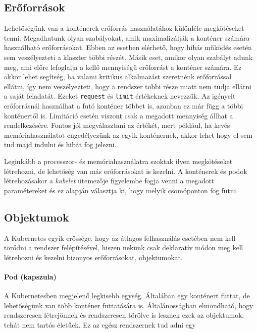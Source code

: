 \subsection{Erőforrások}
Lehetőségünk van a konténerek erőforrás használatához különféle megkötéseket tenni. Megadhatunk olyan
szabályokat, amik maximalizálják a konténer számára használható erőforrásokat. Ebben az esetben
elérhető, hogy hibás működés esetén sem veszélyezteti a klaszter többi részét. Másik eset, amikor
olyan szabályt adunk meg, ami előre lefoglalja a kellő mennyiségű erőforrást a konténer számára. Ez
akkor lehet segítség, ha valami kritikus alkalmazást szeretnénk erőforrással ellátni, így nem
veszélyezteti, hogy a rendszer többi része miatt nem tudja ellátni a saját feladatát. Ezeket 
\verb+request+  és \verb+limit+ értékeknek nevezzük. Az igényelt erőforrásnál használhat a futó
konténer többet is, azonban ez már függ a többi konténertől is. Limitáció esetén viszont csak a
megadott mennyiség állhat a rendelkezésére. Fontos jól megválasztani az értékét, mert például, ha
kevés memóriahasználatot engedélyezünk az egyik konténernek, akkor lehet hogy el sem tud majd
indulni és hibát fog jelezni.

Leginkább a processzor- és memóriahasználatra szoktak ilyen megkötéseket létrehozni, de lehetőség
van más erőforrásokat is kezelni.
A konténerek és podok létrehozásakor a \textit{kubelet} ütemezője figyelembe fogja venni a megadott
paramétereket és ez alapján választja ki, hogy melyik csomóponton fog futni. 

\subsection{Objektumok}
A Kubernetes egyik erőssége, hogy az átlagos felhasználás esetében nem kell törődni a rendszer felépítésével, hiszen nekünk csak deklaratív módon meg kell létrehozni és kezelni bizonyos erőforrásokat, objektumokat.
  
\paragraph{Pod (kapszula)}
A Kubernetesben megjelenő legkisebb egység. Általában egy konténert futtat, de lehetőségünk van több konténer futtatására is. Általánosságban elmondható, hogy rendszeresen létrejönnek és rendszeresen törölve is lesznek ezek az objektumok, tehát nem tartós életűek. Ez az egész rendszernek tud adni egy 

